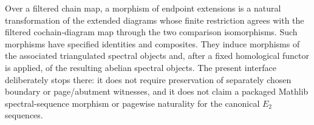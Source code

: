\begin{definition}
  \label{def:filtered-complex-endpoint-extension-morphism}
  \leanok
  Over a filtered chain map, a morphism of endpoint extensions is a natural
  transformation of the extended diagrams whose finite restriction agrees
  with the filtered cochain-diagram map through the two comparison
  isomorphisms.  Such morphisms have specified identities and composites.
  They induce morphisms of the associated triangulated spectral objects and,
  after a fixed homological functor is applied, of the resulting abelian
  spectral objects.  The present interface deliberately stops there: it does
  not require preservation of separately chosen boundary or page/abutment
  witnesses, and it does not claim a packaged Mathlib spectral-sequence
  morphism or pagewise naturality for the canonical $E_2$ sequences.
\end{definition}


